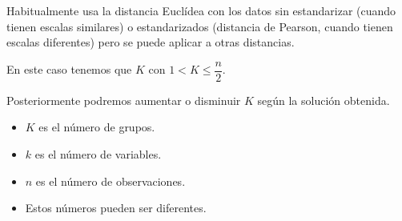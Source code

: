 Habitualmente usa la distancia Euclídea con los datos sin estandarizar (cuando tienen escalas similares) o estandarizados (distancia de Pearson, cuando tienen escalas diferentes) pero se puede aplicar a otras distancias.

En este caso tenemos que  $K$ con $1<K\le\dfrac{n}{2}$.

Posteriormente podremos aumentar o disminuir $K$ según la solución obtenida.

\begin{itemize}
\item $K$ es el número de grupos.
\item $k$ es el número de variables.
\item $n$ es el número de observaciones.
\item Estos números pueden ser diferentes.
\end{itemize}
